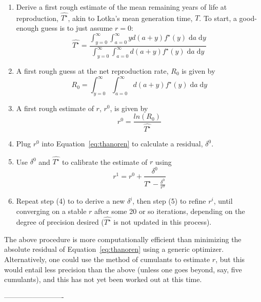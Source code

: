 \documentclass{article}
\newcommand{\dd}{\; \mathrm{d}}
\begin{document}
\begin{appendices}
\begin{enumerate}
  \item Derive a first rough estimate of the mean remaining years of life at
  reproduction, $\widehat{T^\star}$, akin to Lotka's mean generation time, $T$.
  To start, a good-enough guess is to just assume $r=0$:
\begin{equation}
\widehat{T^\star} = \frac{\int _{y=0}^\infty \int _{a=0}^\infty y d (a+y)
f^\star(y) \dd a \dd y}{\int _{y=0}^\infty \int _{a=0}^\infty d(a+y) f^\star(y)
\dd a \dd y}
\end{equation}
  \item A first rough guess at the net reproduction rate, $R_0$ is given by
 \begin{equation}
  R_0 = \int _{y=0}^\infty \int _{a=0}^\infty d(a+y) f^\star(y) \dd a
\dd y
\end{equation}
  \item A first rough estimate of $r$, $r^0$, is given by
   \begin{equation}
   r^0 = \frac{ln(R_0)}{\widehat{T^\star}}
   \end{equation}
  \item Plug $r^0$ into Equation~\eqref{eq:thanoren} to calculate a
  residual, $\delta^0$.
  \item Use $\delta^0$ and $\widehat{T^\star}$ to calibrate the estimate of $r$
  using
  \begin{equation}
  r^{1} = r^0 + \frac{\delta^0}{\widehat{T^\star} - \frac{\delta^0}{r^0}}
  \end{equation}
  \item Repeat step (4) to to derive a new $\delta^i$, then step (5) to refine
  $r^i$, until converging on a stable $r$ after some 20 or so iterations,
  depending on the degree of precision desired ($\widehat{T^\star}$ is not updated
  in this process).
\end{enumerate}

The above procedure is more computationally efficient than minimizing the
absolute residual of Equation~\eqref{eq:thanoren} using a generic
optimizer. Alternatively, one could use the method of cumulants to estimate $r$,
but this would entail less precision than the above (unless one goes beyond,
say, five cumulants), and this has not yet been worked out at this time.
 
\end{appendices}
\nocite{HMD,HFD}
-------------------------

    
\end{document}
